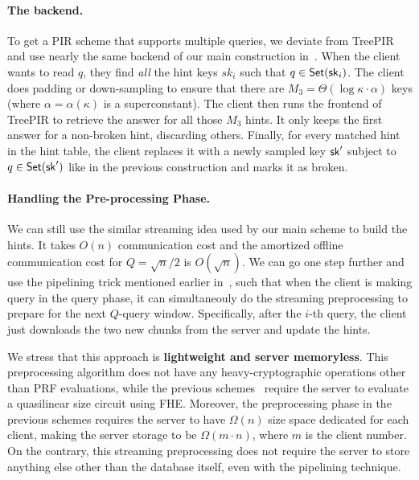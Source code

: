 \paragraph{The backend.} To get a PIR scheme that supports multiple queries, we deviate from TreePIR and use nearly the same backend of our main construction in~. When the client wants to read $q$, they find \emph{all} the hint keys $sk_i$ such that $q\in\mathsf{Set}(\mathsf{sk}_i)$.
The client does padding or down-sampling to ensure that there are $M_3=\Theta(\log \kappa \cdot \alpha)$ keys (where $\alpha=\alpha(\kappa)$ is a superconstant).
The client then runs the frontend of TreePIR to retrieve the answer for all those $M_3$ hints. 
It only keeps the first answer for a non-broken hint, discarding others. 
Finally, for every matched hint in the hint table, the client replaces it with a newly sampled key $\mathsf{sk}'$ subject to $q\in\mathsf{Set}(\mathsf{sk}')$ like in the previous construction and marks it as broken.

\paragraph{Handling the Pre-processing Phase.} We can still use the similar streaming idea used by our main scheme to build the hints. 
It takes $O(n)$ communication cost and the amortized offline communication cost for $Q=\sqrt{n}/2$ is $O(\sqrt{n})$. 
We can go one step further and use the pipelining trick mentioned earlier in~, such that when the client is making query in the query phase, it can simultaneouly do the streaming preprocessing to prepare for the next $Q$-query window. 
Specifically, after the $i$-th query, the client just downloads the two new chunks from the server and update the hints. 


We stress that this approach is \textbf{lightweight and server memoryless}.
This preprocessing algorithm does not have any heavy-cryptographic operations other than PRF evaluations, while the previous schemes~\cite{pir-ec23,lazza-pir} require the server to evaluate a quasilinear size circuit using FHE.
Moreover, the preprocessing phase in the previous schemes requires the server to have $\Omega(n)$ size space dedicated for each client, making the server storage to be $\Omega(m\cdot n)$, where $m$ is the client number. 
On the contrary, this streaming preprocessing does not require the server to store anything else other than the database itself, even with the pipelining technique.



